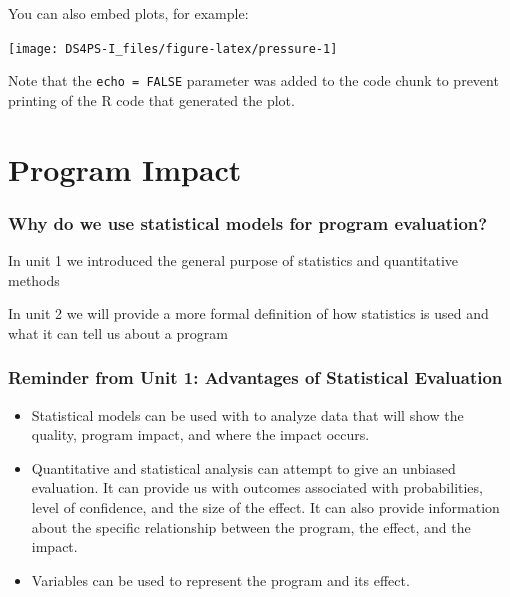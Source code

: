 \documentclass[]{book}
\providecommand{\tightlist}{%
  \setlength{\itemsep}{0pt}\setlength{\parskip}{0pt}}
\theoremstyle{definition}
\theoremstyle{definition}
\theoremstyle{definition}
\theoremstyle{remark}
\begin{document}
You can also embed plots, for example:

\begin{center}\texttt{[image: DS4PS-I\_files/figure-latex/pressure-1]} \end{center}

Note that the \texttt{echo\ =\ FALSE} parameter was added to the code
chunk to prevent printing of the R code that generated the plot.

\hypertarget{program-impact}{%
\chapter{Program Impact}\label{program-impact}}

\hypertarget{why-do-we-use-statistical-models-for-program-evaluation}{%
\subsection{Why do we use statistical models for program
evaluation?}\label{why-do-we-use-statistical-models-for-program-evaluation}}

In unit 1 we introduced the general purpose of statistics and
quantitative methods

In unit 2 we will provide a more formal definition of how statistics is
used and what it can tell us about a program

\hypertarget{reminder-from-unit-1-advantages-of-statistical-evaluation}{%
\subsection{Reminder from Unit 1: Advantages of Statistical
Evaluation}\label{reminder-from-unit-1-advantages-of-statistical-evaluation}}

\begin{itemize}
\tightlist
\item
  Statistical models can be used with to analyze data that will show the
  quality, program impact, and where the impact occurs.
\item
  Quantitative and statistical analysis can attempt to give an unbiased
  evaluation. It can provide us with outcomes associated with
  probabilities, level of confidence, and the size of the effect. It can
  also provide information about the specific relationship between the
  program, the effect, and the impact.
\item
  Variables can be used to represent the program and its effect.
\end{itemize}
\end{document}
